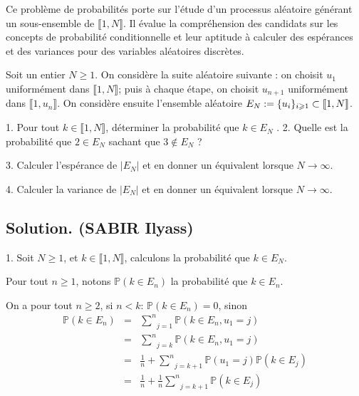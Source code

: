 Ce probl{\`e}me de probabilit{\'e}s porte sur l'{\'e}tude d'un processus
al{\'e}atoire g{\'e}n{\'e}rant un sous-ensemble de $\llbracket 1, N
\rrbracket$. Il {\'e}value la compr{\'e}hension des candidats sur les concepts
de probabilit{\'e} conditionnelle et leur aptitude {\`a} calculer des
esp{\'e}rances et des variances pour des variables al{\'e}atoires
discr{\`e}tes.
\begin{exercise}[]
Soit un entier $N \geqslant 1$. On consid{\`e}re la suite al{\'e}atoire
suivante : on choisit $u_1$ uniform{\'e}ment dans $\llbracket 1, N
\rrbracket$; puis {\`a} chaque {\'e}tape, on choisit $u_{n + 1}$
uniform{\'e}ment dans $\llbracket 1, u_n \rrbracket$. On consid{\`e}re ensuite
l'ensemble al{\'e}atoire $E_N := \{ u_i \}_{i \geqslant 1} \subset
\llbracket 1, N \rrbracket$.

1. Pour tout $k \in \llbracket 1, N \rrbracket$, d{\'e}terminer la
probabilit{\'e} que $k \in E_N$ .
2. Quelle est la probabilité que $2 \in E_N$ sachant que $3 \notin E_N$ ?


3. Calculer l'esp{\'e}rance de $|E_N |$ et en donner un {\'e}quivalent
lorsque $N \rightarrow \infty$.

4. Calculer la variance de $|E_N |$ et en donner un {\'e}quivalent lorsque $N
\rightarrow \infty$.
\end{exercise}

\subsection*{Solution. (SABIR Ilyass)}


1. Soit $N \geqslant 1$, et $k \in \llbracket 1, N \rrbracket$, calculons la
probabilit{\'e} que $k \in E_N$.

Pour tout $n \geqslant 1$, notons $\mathbb{P} (k \in E_n)$ la probabilit{\'e}
que $k \in E_n$.

On a pour tout $n \geqslant 2$, si $n < k$: $\mathbb{P} (k \in E_n) = 0$,
sinon
\begin{eqnarray*}
  \mathbb{P} (k \in E_n) & = & \underset{j = 1}{\overset{n}{\sum}} \mathbb{P}
  (k \in E_n, u_1 = j)\\
  & = & \underset{j = k}{\overset{n}{\sum}} \mathbb{P} (k \in E_n, u_1 = j)\\
  & = & \frac{1}{n} + \underset{j = k + 1}{\overset{n}{\sum}} \mathbb{P} (u_1
  = j) \mathbb{P} (k \in E_j)\\
  & = & \frac{1}{n} + \frac{1}{n} \underset{j = k + 1}{\overset{n}{\sum}}
  \mathbb{P} (k \in E_j)
\end{eqnarray*}


